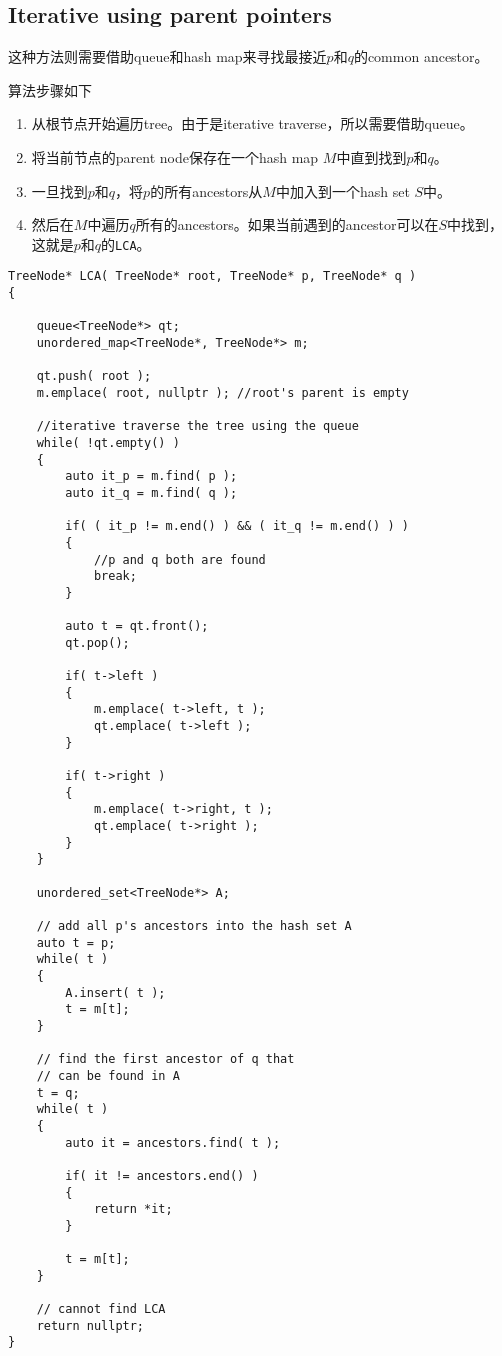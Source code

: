 \subsection{Iterative using parent pointers}
\begin{CJK*}{UTF8}{gbsn}
这种方法则需要借助queue和hash map来寻找最接近$p$和$q$的common ancestor。
\par
算法步骤如下
\begin{enumerate}
\item 从根节点开始遍历tree。由于是iterative traverse，所以需要借助queue。
\item 将当前节点的parent node保存在一个hash map $M$中直到找到$p$和$q$。
\item 一旦找到$p$和$q$，将$p$的所有ancestors从$M$中加入到一个hash set $S$中。
\item 然后在$M$中遍历$q$所有的ancestors。如果当前遇到的ancestor可以在$S$中找到，这就是$p$和$q$的\texttt{LCA}。
\end{enumerate}
\end{CJK*}
\begin{lstlisting}[style=customc, caption={Iterative Searching}]
TreeNode* LCA( TreeNode* root, TreeNode* p, TreeNode* q )
{

    queue<TreeNode*> qt;
    unordered_map<TreeNode*, TreeNode*> m;

    qt.push( root );
    m.emplace( root, nullptr ); //root's parent is empty

    //iterative traverse the tree using the queue
    while( !qt.empty() )
    {
        auto it_p = m.find( p );
        auto it_q = m.find( q );

        if( ( it_p != m.end() ) && ( it_q != m.end() ) )
        {
            //p and q both are found
            break;
        }

        auto t = qt.front();
        qt.pop();

        if( t->left )
        {
            m.emplace( t->left, t );
            qt.emplace( t->left );
        }

        if( t->right )
        {
            m.emplace( t->right, t );
            qt.emplace( t->right );
        }
    }

    unordered_set<TreeNode*> A;

    // add all p's ancestors into the hash set A
    auto t = p;
    while( t )
    {
        A.insert( t );
        t = m[t];
    }

    // find the first ancestor of q that
    // can be found in A
    t = q;
    while( t )
    {
        auto it = ancestors.find( t );

        if( it != ancestors.end() )
        {
            return *it;
        }

        t = m[t];
    }

    // cannot find LCA
    return nullptr;
}
\end{lstlisting}